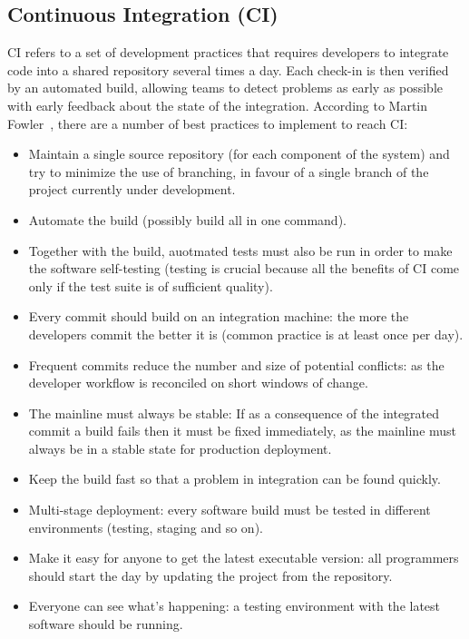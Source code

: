 \documentclass[a4paper,
               keeplastbox,   %
               ]{jacow}
\begin{document}
\subsection{Continuous Integration (CI)}
CI refers to a set of development practices that requires developers to integrate code into a shared repository several times a day. Each check-in is then verified by an automated build, allowing teams to detect problems as early as possible with early feedback about the state of the integration.
According to Martin Fowler~\cite{CI}, there are a number of best practices to implement to reach CI:
\begin{itemize}
    \item Maintain a single source repository (for each component of the system) and try to minimize the use of branching, in favour of a single branch of the project currently under development.
    \item Automate the build (possibly build all in one command).
    \item Together with the build, auotmated tests must also be run in order to make the software self-testing (testing is crucial because all the benefits of CI come only if the test suite is of sufficient quality).
    \item Every commit should build on an integration machine: the more the developers commit the better it is (common practice is at least once per day).
    \item Frequent commits reduce the number and size of potential conflicts: as the developer workflow is reconciled on short windows of change.
    \item The mainline must always be stable: If as a consequence of the integrated commit a build fails then it must be fixed immediately, as the mainline must always be in a stable state for production deployment.
    \item Keep the build fast so that a problem in integration can be found quickly.
    \item Multi-stage deployment: every software build must be tested in different environments (testing, staging and so on).
    \item Make it easy for anyone to get the latest executable version: all programmers should start the day by updating the project from the repository.
    \item Everyone can see what’s happening: a testing environment with the latest software should be running.
\end{itemize}
\end{document}
